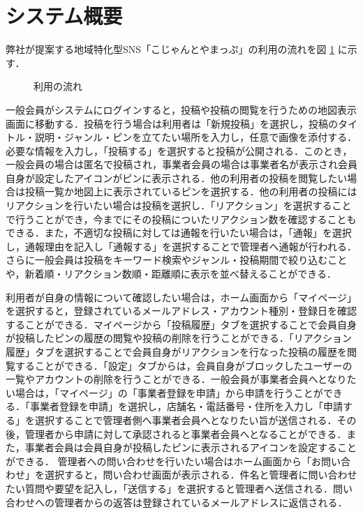 \section{システム概要}
弊社が提案する地域特化型SNS「こじゃんとやまっぷ」の利用の流れを図 \ref{fig:sec2/sys} に示す．

\begin{figure}[H]
    \centering
    
    \caption{利用の流れ}
    \label{fig:sec2/sys}
\end{figure}
一般会員がシステムにログインすると，投稿や投稿の閲覧を行うための地図表示画面に移動する．投稿を行う場合は利用者は「新規投稿」を選択し，投稿のタイトル・説明・ジャンル・ピンを立てたい場所を入力し，任意で画像を添付する．必要な情報を入力し，「投稿する」を選択すると投稿が公開される．このとき，一般会員の場合は匿名で投稿され，事業者会員の場合は事業者名が表示され会員自身が設定したアイコンがピンに表示される．他の利用者の投稿を閲覧したい場合は投稿一覧か地図上に表示されているピンを選択する．他の利用者の投稿にはリアクションを行いたい場合は投稿を選択し．「リアクション」を選択することで行うことができ，今までにその投稿についたリアクション数を確認することもできる．また，不適切な投稿に対しては通報を行いたい場合は，「通報」を選択し，通報理由を記入し「通報する」を選択することで管理者へ通報が行われる．さらに一般会員は投稿をキーワード検索やジャンル・投稿期間で絞り込むことや，新着順・リアクション数順・距離順に表示を並べ替えることができる．

利用者が自身の情報について確認したい場合は，ホーム画面から「マイページ」を選択すると，登録されているメールアドレス・アカウント種別・登録日を確認することができる．マイページから「投稿履歴」タブを選択することで会員自身が投稿したピンの履歴の閲覧や投稿の削除を行うことができる．「リアクション履歴」タブを選択することで会員自身がリアクションを行なった投稿の履歴を閲覧することができる．「設定」タブからは，会員自身がブロックしたユーザーの一覧やアカウントの削除を行うことができる．一般会員が事業者会員へとなりたい場合は，「マイページ」の「事業者登録を申請」から申請を行うことができる．「事業者登録を申請」を選択し，店舗名・電話番号・住所を入力し「申請する」を選択することで管理者側へ事業者会員へとなりたい旨が送信される．その後，管理者から申請に対して承認されると事業者会員へとなることができる．また，事業者会員は会員自身が投稿したピンに表示されるアイコンを設定することができる．
管理者への問い合わせを行いたい場合はホーム画面から「お問い合わせ」を選択すると，問い合わせ画面が表示される．件名と管理者に問い合わせたい質問や要望を記入し，「送信する」を選択すると管理者へ送信される．問い合わせへの管理者からの返答は登録されているメールアドレスに返信される．

